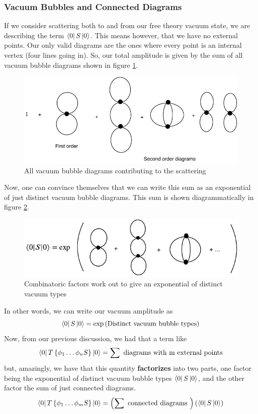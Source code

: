 \subsubsection{Vacuum Bubbles and Connected Diagrams} 
If we consider scattering both to and from our 
free theory vacuum state, we are describing the term 
$ \bra{ 0 } S \ket{ 0 }  $. This means however, 
that we have no external points. Our only valid diagrams 
are the ones where every point is an internal vertex (four lines 
going in). So, our total amplitude 
is given by the sum of all vacuum bubble diagrams
shown in figure \ref{fig:vacuumExpand}.  
\begin{figure}[htpb]
	\centering
	\includegraphics[width=0.8\linewidth]{figures/vacuumExpand.pdf}
	\caption{All vacuum bubble diagrams contributing 
	to the scattering}%
	\label{fig:vacuumExpand}
\end{figure}
Now, one can convince themselves that we can write 
this sum as an exponential of just distinct vacuum bubble diagrams. 
This sum is shown diagrammatically in figure \ref{fig:fourvac}. 
\begin{figure}[h]
	\centering
	\includegraphics[width=0.8\linewidth]{figures/PhiFourVacuumExp.pdf}
	\caption{Combinatoric factors work out to give an exponential 
	of distinct vacuum types}%
	\label{fig:fourvac}
\end{figure}
In other words, we can write our vacuum amplitude as 
\[
	\bra{ 0 } S \ket{ 0 } = \exp \left(  \text{Distinct vacuum bubble types} \right) 
\] 
Now, from our previous discussion, we had that a term like 
\[
 \bra{ 0 } T \left\{  \phi _ 1 \dots \phi _ n   S \right\}  \ket{ 0 } = \sum \text{ 
 diagrams with m external points}
\]  but, amazingly, we have that this quantity \textbf{factorizes}
into two parts, one factor being the exponential of 
distinct vacuum bubble types $ \bra{ 0 } S \ket{ 0 } $, 
and the other factor the sum of just connected diagrams. 
\[
	\bra{ 0 } T \left\{  \phi _ 1 \dots \phi _ m S  \right\} \ket{ 0 } = 
	\left(  \sum \text{ connected diagrams }  \right) \left(  \bra{ 0 } S \ket{ 0 }  \right) 
\]  
